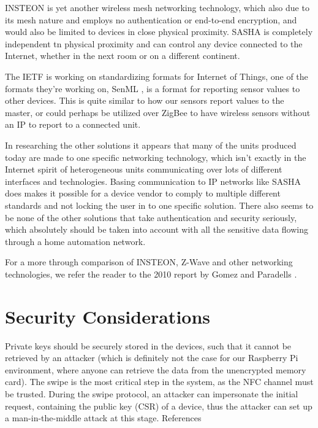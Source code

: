 INSTEON is yet another wireless mesh networking technology, which also due to its mesh nature and employs no authentication or end-to-end encryption, and would also be limited to devices in close physical proximity. SASHA is completely independent tn physical proximity and can control any device connected to the Internet, whether in the next room or on a different continent.

The IETF is working on standardizing formats for Internet of Things, one of the formats they're working on, SenML \cite{senml}, is a format for reporting sensor values to other devices. This is quite similar to how our sensors report values to the master, or could perhaps be utilized over ZigBee to have wireless sensors without an IP to report to a connected unit.

In researching the other solutions it appears that many of the units produced today are made to one specific networking technology, which isn't exactly in the Internet spirit of heterogeneous units communicating over lots of different interfaces and technologies. Basing communication to IP networks like SASHA does makes it possible for a device vendor to comply to multiple different standards and not locking the user in to one specific solution. There also seems to be none of the other solutions that take authentication and security seriously, which absolutely should be taken into account with all the sensitive data flowing through a home automation network.

For a more through comparison of INSTEON, Z-Wave and other networking technologies, we refer the reader to the 2010 report by Gomez and Paradells \cite{comparison-of-technologies}.

\section{Security Considerations}

Private keys should be securely stored in the devices, such that it cannot be retrieved by an attacker (which is definitely not the case for our Raspberry Pi environment, where anyone can retrieve the data from the unencrypted memory card).
The swipe is the most critical step in the system, as the NFC channel must be trusted. During the swipe protocol, an attacker can impersonate the initial request, containing the public key (CSR) of a device, thus the attacker can set up a man-in-the-middle attack at this stage.
References
